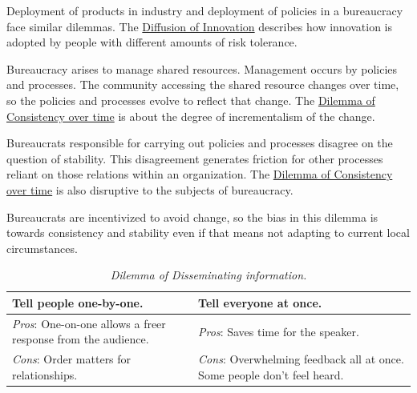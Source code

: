 Deployment of products in industry and deployment of policies in a bureaucracy face similar dilemmas. The \href{https://en.wikipedia.org/wiki/Diffusion_of_innovations}{Diffusion of Innovation} 
describes how innovation is adopted by people with different amounts of risk tolerance.

Bureaucracy arises to manage shared resources. Management occurs by policies and processes. The community accessing the shared resource changes over time, so the policies and processes evolve to reflect that change. The \hyperref[table:dilemma-personal-consistency-gradual-stepwise]{Dilemma of Consistency over time} is about the degree of incrementalism of the change.

Bureaucrats responsible for carrying out policies and processes disagree on the question of stability. This disagreement generates friction for other processes reliant on those relations within an organization.
The \hyperref[table:dilemma-personal-consistency-gradual-stepwise]{Dilemma of Consistency over time} is also disruptive to the subjects of bureaucracy. 

Bureaucrats are incentivized to avoid change, so the bias in this dilemma is towards consistency and stability even if that means not adapting to current local circumstances. 

\begin{center}
\begin{table}[H] %
\begin{tabular}{ | m{\dilemmatablewidth}| m{\dilemmatablewidth} | } 
  \hline
  \textbf{Tell people one-by-one.} & 
  \textbf{Tell everyone at once.} \\ 
  \hline
  \textit{Pros}: One-on-one allows a freer response from the audience. &
  \textit{Pros}: Saves time for the speaker. \\
  \hline
  \textit{Cons}: Order matters for relationships. & 
  \textit{Cons}: Overwhelming feedback all at once. Some people don't feel heard. \\  
  \hline
\end{tabular}
\caption{
\textit{Dilemma of Disseminating information.}
}
\label{table:dilemma-personal-disseminate-one-by-one}
\end{table}
\end{center}

